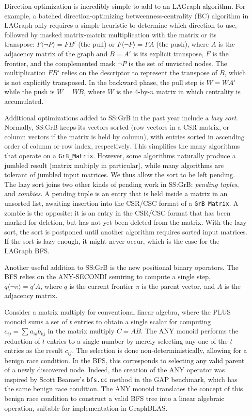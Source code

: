 Direction-optimization is incredibly simple to add to an LAGraph algorithm.
For example, a batched direction-optimizing betweenness-centrality (BC)
algorithm in LAGraph only requires a simple heuristic to determine which
direction to use, followed by masked matrix-matrix multiplication with the
matrix or its transpose: $F \langle \neg P \rangle =FB'$ (the pull) or $F
\langle \neg P \rangle =FA$ (the push), where $A$ is the adjacency matrix of
the graph and $B=A'$ is its explicit transpose, $F$ is the frontier, and the
complemented mask $\neg P$ is the set of unvisited nodes.  The multiplication
$FB'$ relies on the descriptor to represent the transpose of $B$, which is not
explicitly transposed.  In the backward phase, the pull step is $W=WA'$ while
the push is $W=WB$, where $W$ is the 4-by-$n$ matrix in which centrality is
accumulated.

Additional optimizations added to SS:GrB in the past year include a {\em lazy
sort}.  Normally, SS:GrB keeps its vectors sorted (row vectors in a CSR matrix,
or column vectors if the matrix is held by column), with entries sorted in
ascending order of column or row index, respectively.  This simplifies the many
algorithms that operate on a \verb'GrB_Matrix'.  However, some algorithms
naturally produce a jumbled result (matrix multiply in particular), while many
algorithms are tolerant of jumbled input matrices.  We thus allow the sort to
be left pending.  The lazy sort joins two other kinds of pending work in
SS:GrB: {\em pending tuples}, and {\em zombies}.  A pending tuple is an entry
that is held inside a matrix in an unsorted list, awaiting insertion into the
CSR/CSC format of a \verb'GrB_Matrix'.  A zombie is the opposite: it is an
entry in the CSR/CSC format that has been marked for deletion, but has not yet
been deleted from the matrix.  With the lazy sort, the sort is postponed until
another algorithm requires sorted input matrices.  If the sort is lazy enough,
it might never occur, which is the case for the LAGraph BFS.

Another useful addition to SS:GrB is the new positional binary operators.
The BFS relies on the ANY-SECONDI semiring to compute a single step,
$q \langle \neg \pi \rangle = q'A$, where $q$ is the current frontier
$\pi$ is the parent vector, and $A$ is the adjacency matrix.

Consider a matrix multiply for conventional linear algebra, where the PLUS
monoid sums a set of $t$ entries to obtain a single scalar for computing
$c_{ij} = \sum a_{ik} b_{kj}$ in the matrix multiply $C=AB$.  The ANY monoid
performs the reduction of $t$ entries to a single number by merely selecting
any one of the $t$ entries as the result $c_{ij}$.  The selection is done
non-deterministically, allowing for a benign race condition.  In the BFS, this
corresponds to selecting any valid parent of a newly discovered node.  Indeed,
the creation of the ANY operator was inspired by Scott Beamer's \verb'bfs.cc'
method in the GAP benchmark, which has the same benign race condition.  The ANY
monoid translates the concept of this benign race condition to construct a
valid BFS tree into a linear algebraic operation, suitable for implementation
in GraphBLAS.

